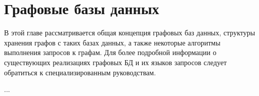 
\chapter{Графовые базы данных}

В этой главе рассматривается общая концепция графовых баз данных,
структуры хранения графов с таких базах данных, а также некоторые
алгоритмы выполнения запросов к графам. Для более подробной информации
о существующих реализациях графовых БД и их языков запросов следует
обратиться к специализированным руководствам.

...
